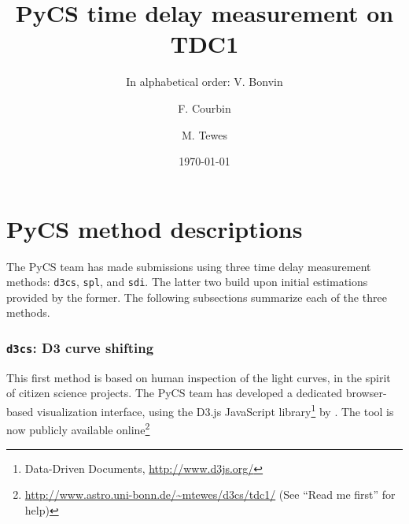 \documentclass[traditabstract]{aa}
\begin{document}
\title{PyCS time delay measurement on TDC1}
\author{ In alphabetical order:
V. Bonvin\inst{\ref{epfl}} \and
F. Courbin\inst{\ref{epfl}} \and
M. Tewes\inst{\ref{bonn}}
}


\date{\today}

\maketitle



\section{PyCS method descriptions}




The PyCS team has made submissions using three time delay measurement
methods: {\tt d3cs}, {\tt spl}, and {\tt sdi}. The latter two build
upon initial estimations provided by the former. The following subsections
summarize each of the three methods.

\subsubsection{{\tt d3cs}: D3 curve shifting}

This first method is based on human inspection of the light curves, in
the spirit of citizen science projects. The PyCS team has developed a dedicated
browser-based visualization interface, using the D3.js JavaScript
library\footnote{Data-Driven Documents, \url{http://www.d3js.org/}} by
\citet{d3}. The tool is now publicly available
online\footnote{\url{http://www.astro.uni-bonn.de/~mtewes/d3cs/tdc1/}
(See ``Read me first'' for help)} 
\end{document}
